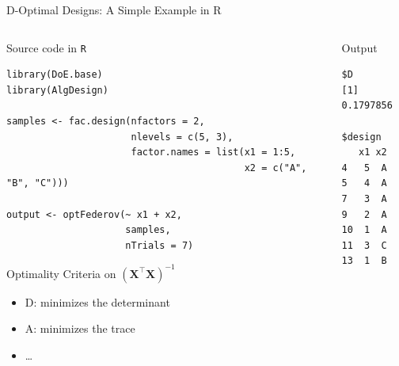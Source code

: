 \documentclass[10pt, compress, aspectratio=169, xcolor={table,usenames,dvipsnames}]{beamer}
\begin{document}
\begin{frame}[label={sec:org2db987f},fragile]{D-Optimal Designs: A Simple Example in R}
 \begin{columns}
\begin{column}{0.7\columnwidth}
\begin{block}{Source code in \texttt{R}}
\vspace{-.2cm}

\lstset{language=r,label= ,caption= ,captionpos=b,numbers=none}
\begin{lstlisting}
library(DoE.base)
library(AlgDesign)

samples <- fac.design(nfactors = 2,
                      nlevels = c(5, 3),
                      factor.names = list(x1 = 1:5,
                                          x2 = c("A", "B", "C")))

output <- optFederov(~ x1 + x2,
                     samples,
                     nTrials = 7)
\end{lstlisting}

\begin{block}{Optimality Criteria on \(\left(\bm{X}^{\intercal}\bm{X}\right)^{-1}\)}
\begin{itemize}
\item \alert{D}: minimizes the determinant
\item \alert{A}: minimizes the trace
\item \dots{}
\end{itemize}
\end{block}
\end{block}
\end{column}


\begin{column}{0.3\columnwidth}
\begin{block}{Output}
\vspace{-.2cm}
\scriptsize

\begin{verbatim}
$D
[1] 0.1797856

$design
   x1 x2
4   5  A
5   4  A
7   3  A
9   2  A
10  1  A
11  3  C
13  1  B
\end{verbatim}


\normalsize
\end{block}
\end{column}
\end{columns}
\end{frame}
\end{document}
